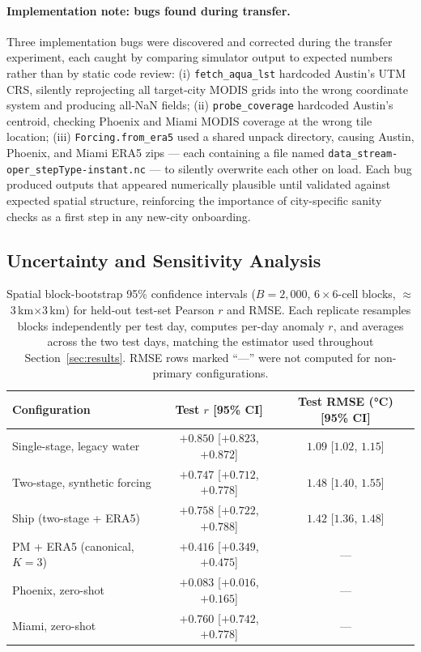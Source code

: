 \documentclass[12pt, letterpaper]{article}
\begin{document}
\paragraph{Implementation note: bugs found during transfer.}
Three implementation bugs were discovered and corrected during the
transfer experiment, each caught by comparing simulator output to
expected numbers rather than by static code review: (i)
\texttt{fetch\_aqua\_lst} hardcoded Austin's UTM CRS, silently
reprojecting all target-city MODIS grids into the wrong coordinate
system and producing all-NaN fields; (ii) \texttt{probe\_coverage}
hardcoded Austin's centroid, checking Phoenix and Miami MODIS coverage
at the wrong tile location; (iii) \texttt{Forcing.from\_era5} used a
shared unpack directory, causing Austin, Phoenix, and Miami ERA5 zips
— each containing a file named \texttt{data\_stream-oper\_stepType-instant.nc}
— to silently overwrite each other on load. Each bug produced outputs
that appeared numerically plausible until validated against expected
spatial structure, reinforcing the importance of city-specific
sanity checks as a first step in any new-city onboarding.

\subsection{Uncertainty and Sensitivity Analysis}
\label{sec:uncertainty}

\begin{table}[ht]
  \centering
  \caption{Spatial block-bootstrap 95\% confidence intervals ($B = 2{,}000$,
  $6 \times 6$-cell blocks, $\approx$3\,km$\times$3\,km) for held-out
  test-set Pearson $r$ and RMSE. Each replicate resamples blocks independently
  per test day, computes per-day anomaly $r$, and averages across the two
  test days, matching the estimator used throughout Section~\ref{sec:results}.
  RMSE rows marked ``---'' were not computed for non-primary configurations.}
  \label{tab:bootstrap_ci}
  \begin{tabular}{lcc}
    \toprule
    Configuration & Test $r$ [95\% CI] & Test RMSE (°C) [95\% CI] \\
    \midrule
    Single-stage, legacy water   & $+0.850$ [$+0.823$, $+0.872$] & $1.09$ [$1.02$, $1.15$] \\
    Two-stage, synthetic forcing & $+0.747$ [$+0.712$, $+0.778$] & $1.48$ [$1.40$, $1.55$] \\
    Ship (two-stage + ERA5)      & $+0.758$ [$+0.722$, $+0.788$] & $1.42$ [$1.36$, $1.48$] \\
    PM + ERA5 (canonical, $K=3$) & $+0.416$ [$+0.349$, $+0.475$] & --- \\
    Phoenix, zero-shot           & $+0.083$ [$+0.016$, $+0.165$] & --- \\
    Miami, zero-shot             & $+0.760$ [$+0.742$, $+0.778$] & --- \\
    \bottomrule
  \end{tabular}
\end{table}
\end{document}
